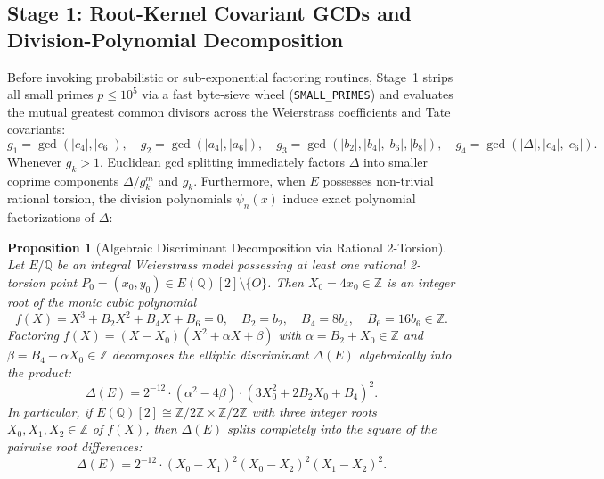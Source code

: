 \documentclass[10pt,a4paper]{article}
\theoremstyle{plain}
\newtheorem{proposition}[theorem]{Proposition}
\theoremstyle{definition}
\theoremstyle{remark}
\begin{document}
\subsection{Stage 1: Root-Kernel Covariant GCDs and Division-Polynomial Decomposition}

Before invoking probabilistic or sub-exponential factoring routines, Stage~1 strips all small primes $p \le 10^5$ via a fast byte-sieve wheel (\texttt{SMALL\_PRIMES}) and evaluates the mutual greatest common divisors across the Weierstrass coefficients and Tate covariants:
\begin{equation}
g_1 = \gcd(|c_4|, |c_6|), \quad g_2 = \gcd(|a_4|, |a_6|), \quad g_3 = \gcd(|b_2|, |b_4|, |b_6|, |b_8|), \quad g_4 = \gcd(|\Delta|, |c_4|, |c_6|).
\end{equation}
Whenever $g_k > 1$, Euclidean gcd splitting immediately factors $\Delta$ into smaller coprime components $\Delta / g_k^m$ and $g_k$. Furthermore, when $E$ possesses non-trivial rational torsion, the division polynomials $\psi_n(x)$ induce exact polynomial factorizations of $\Delta$:

\begin{proposition}[Algebraic Discriminant Decomposition via Rational 2-Torsion]\label{prop:cubic_peeling}
Let $E/\mathbb{Q}$ be an integral Weierstrass model possessing at least one rational 2-torsion point $P_0 = (x_0, y_0) \in E(\mathbb{Q})[2] \setminus \{O\}$. Then $X_0 = 4x_0 \in \mathbb{Z}$ is an integer root of the monic cubic polynomial
\begin{equation}\label{eq:monic_cubic}
f(X) = X^3 + B_2 X^2 + B_4 X + B_6 = 0, \quad B_2 = b_2, \quad B_4 = 8b_4, \quad B_6 = 16b_6 \in \mathbb{Z}.
\end{equation}
Factoring $f(X) = (X - X_0)(X^2 + \alpha X + \beta)$ with $\alpha = B_2 + X_0 \in \mathbb{Z}$ and $\beta = B_4 + \alpha X_0 \in \mathbb{Z}$ decomposes the elliptic discriminant $\Delta(E)$ algebraically into the product:
\begin{equation}\label{eq:delta_peel}
\Delta(E) = 2^{-12} \cdot (\alpha^2 - 4\beta) \cdot (3X_0^2 + 2B_2 X_0 + B_4)^2.
\end{equation}
In particular, if $E(\mathbb{Q})[2] \cong \mathbb{Z}/2\mathbb{Z} \times \mathbb{Z}/2\mathbb{Z}$ with three integer roots $X_0, X_1, X_2 \in \mathbb{Z}$ of $f(X)$, then $\Delta(E)$ splits completely into the square of the pairwise root differences:
\begin{equation}\label{eq:delta_full_2tors}
\Delta(E) = 2^{-12} \cdot (X_0 - X_1)^2 (X_0 - X_2)^2 (X_1 - X_2)^2.
\end{equation}
\end{proposition}
\end{document}
